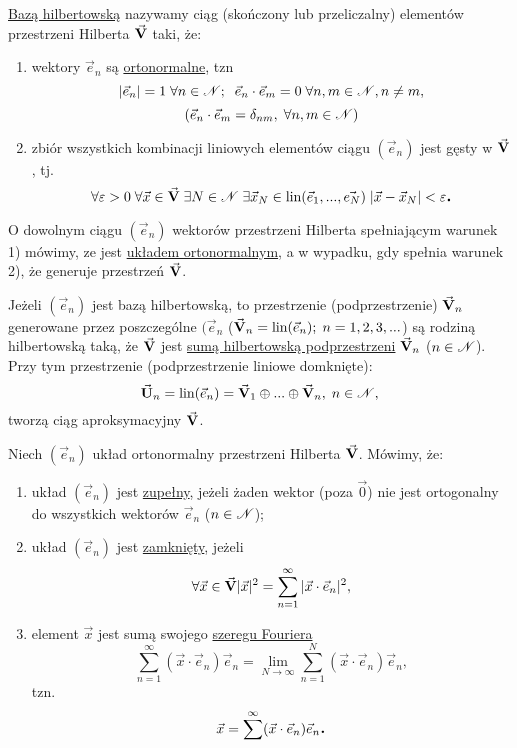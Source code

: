 \begin{mydef}
   \underline{Bazą hilbertowską} nazywamy ciąg (skończony lub przeliczalny) elementów przestrzeni Hilberta $\vec{\mathbf{V}}$ taki, że:
   \begin{enumerate}
    \item wektory $\vec{e}_n$ są \underline{ortonormalne}, tzn
    \[|\vec{e}_n| = 1 \; \forall n \in \mathscr{N}; \;\; \vec{e}_n\cdot \vec{e}_m = 0 \; \forall n,m \in \mathscr{N}, n \neq m,\]
    \[(\vec{e}_n \cdot \vec{e}_m = \delta_{n m}, \; \forall n,m \in \mathscr{N})\]
    \item zbiór wszystkich kombinacji liniowych elementów ciągu $(\vec{e}_n)$ jest gęsty w $\vec{\mathbf{V}}$, tj.
    \[\forall \varepsilon > 0 \;\forall \vec{x} \in \vec{\mathbf{V}}\; \exists N \in \mathscr{N} \; \exists \vec{x}_N \in \normalfont\mbox{lin} (\vec{e}_1, ..., \vec{e_N}) \; |\vec{x} - \vec{x}_N| < \varepsilon \mbox{\large\bfseries .}\]
   \end{enumerate}
\end{mydef}

\begin{info}
   O dowolnym ciągu $(\vec{e}_n)$ wektorów przestrzeni Hilberta spełniającym warunek 1) mówimy, ze jest \underline{układem ortonormalnym}, a w wypadku, gdy spełnia warunek 2), że generuje przestrzeń $\vec{\mathbf{V}}$.
\end{info}

\begin{info}
   Jeżeli $(\vec{e}_n)$ jest bazą hilbertowską, to przestrzenie (podprzestrzenie) $\vec{\mathbf{V}}_n$ generowane przez poszczególne $(\vec{e}_n$ ($\vec{\mathbf{V}}_n = \normalfont\mbox{lin} (\vec{e}_n); \; n=1,2,3,...$) są rodziną hilbertowską taką, że $\vec{\mathbf{V}}$ jest \underline{sumą hilbertowską podprzestrzeni} $\vec{\mathbf{V}}_n$ ($n \in \mathscr{N}$). Przy tym przestrzenie (podprzestrzenie liniowe domknięte):
   \[\vec{\mathbf{U}}_n = \normalfont\mbox{lin} (\vec{e}_n) = \vec{\mathbf{V}}_1 \oplus ...\oplus \vec{\mathbf{V}}_n, \; n \in \mathscr{N},\]
   tworzą ciąg aproksymacyjny $\vec{\mathbf{V}}$.
\end{info}

\begin{mydef}
   Niech $(\vec{e}_n)$ układ ortonormalny przestrzeni Hilberta $\vec{\mathbf{V}}$. Mówimy, że:
   \begin{enumerate}
    \item układ $(\vec{e}_n)$ jest \underline{zupełny}, jeżeli żaden wektor (poza $\vec{0}$) nie jest ortogonalny do wszystkich wektorów $\vec{e}_n$ ($n \in \mathscr{N}$);
    \item układ $(\vec{e}_n)$ jest \underline{zamknięty}, jeżeli
    \[\forall \vec{x} \in \vec{\mathbf{V}} |\vec{x}|^2 = \sum\limits_{n=1}^{\infty} |\vec{x} \cdot \vec{e}_n|^2,\]
    \item element $\vec{x}$ jest sumą swojego \underline{szeregu Fouriera}
    \[\sum\limits_{n=1}^{\infty} (\vec{x} \cdot \vec{e}_n) \vec{e}_n = \lim\limits_{N\to \infty} \sum\limits_{n=1}^N (\vec{x} \cdot \vec{e}_n) \vec{e}_n,\]
    tzn.
    \[\vec{x} = \sum\limits^{\infty} (\vec{x} \cdot \vec{e}_n) \vec{e}_n \mbox{\large\bfseries .}\]
   \end{enumerate}

\end{mydef}
